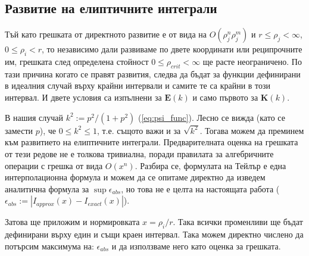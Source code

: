 \subsection{Развитие на елиптичните интеграли}
Тъй като грешката от директното развитие е от вида на $O(\rho_j^n \rho_j^m)$ и $r \le \rho_j < \infty$, $0 \le \rho_i < r$, то независимо дали развиваме по двете координати или
реципрочните им, грешката след определена стойност $0 \le \rho_{crit} < \infty$ ще расте неограничено. По тази причина когато се правят развития, следва да бъдат за функции дефинирани
в идеалния случай върху крайни интервали и самите те са крайни в този интервал. И двете условия са изпълнени за $\boldsymbol{E}(k)$ и само първото за $\boldsymbol{K}(k)$.

В нашия случай $k^2 := p^2/(1+p^2)$ (\autoref{eq:psi_func}). Лесно се вижда (като се замести $p$), че $ 0 \le k^2 \le 1$, т.е. същото важи и за $\sqrt{k^2}$. Тогава можем да преминем към развитието
на елиптичните интеграли. Предварителната оценка на грешката от тези редове не е толкова тривиална, поради правилата за алгебричните операции с грешка от вида $O(x^n)$. Разбира се, формулата на Тейлър е една интерполационна формула и можем да се опитаме директно да изведем
аналитична формула за $\sup\epsilon_{abs}$, но това не е целта на настоящата работа ($\epsilon_{abs} := |I_{approx}(x) - I_{exact}(x)|$).

Затова ще приложим и нормировката $x = \rho_i/r$. Така всички променливи ще бъдат дефинирани върху един и същи краен интервал. Така можем директно числено да потърсим максимума на: $\epsilon_{abs}$ и да използваме
него като оценка за грешката.

